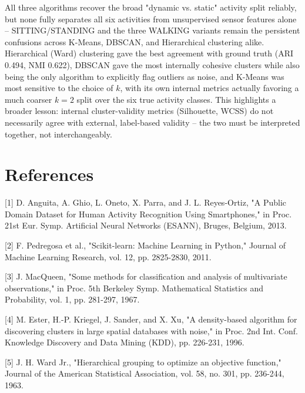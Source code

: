 \documentclass[12pt,a4paper]{article}
\begin{document}
All three algorithms recover the broad "dynamic vs. static" activity
split reliably, but none fully separates all six activities from
unsupervised sensor features alone -- SITTING/STANDING and the three
WALKING variants remain the persistent confusions across K-Means,
DBSCAN, and Hierarchical clustering alike. Hierarchical (Ward) clustering
gave the best agreement with ground truth (ARI 0.494, NMI 0.622), DBSCAN
gave the most internally cohesive clusters while also being the only
algorithm to explicitly flag outliers as noise, and K-Means was most
sensitive to the choice of \(k\), with its own internal metrics actually
favoring a much coarser \(k=2\) split over the six true activity classes.
This highlights a broader lesson: internal cluster-validity metrics
(Silhouette, WCSS) do not necessarily agree with external, label-based
validity -- the two must be interpreted together, not interchangeably.

\section{References}
\label{sec:org64d3a4f}

[1] D. Anguita, A. Ghio, L. Oneto, X. Parra, and J. L. Reyes-Ortiz, "A
Public Domain Dataset for Human Activity Recognition Using Smartphones,"
in Proc. 21st Eur. Symp. Artificial Neural Networks (ESANN), Bruges,
Belgium, 2013.

[2] F. Pedregosa et al., "Scikit-learn: Machine Learning in Python,"
Journal of Machine Learning Research, vol. 12, pp. 2825-2830, 2011.

[3] J. MacQueen, "Some methods for classification and analysis of
multivariate observations," in Proc. 5th Berkeley Symp. Mathematical
Statistics and Probability, vol. 1, pp. 281-297, 1967.

[4] M. Ester, H.-P. Kriegel, J. Sander, and X. Xu, "A density-based
algorithm for discovering clusters in large spatial databases with
noise," in Proc. 2nd Int. Conf. Knowledge Discovery and Data Mining
(KDD), pp. 226-231, 1996.

[5] J. H. Ward Jr., "Hierarchical grouping to optimize an objective
function," Journal of the American Statistical Association, vol. 58,
no. 301, pp. 236-244, 1963.
\end{document}
